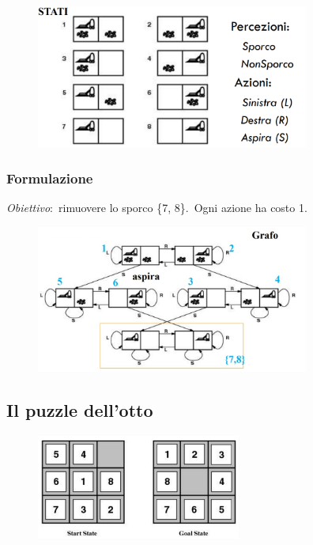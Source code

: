 \begin{figure}[H]
	\centering
	\includegraphics[width=0.8\textwidth]{immagini/Aspirapolvere.png}
\end{figure}
\subsubsection{Formulazione}
\textit{Obiettivo}:\ rimuovere lo sporco \{7, 8\}.\
Ogni azione ha costo 1.
\begin{figure}[H]
	\centering
	\includegraphics[width=0.8\textwidth]{immagini/Aspirapolvere_formulazione.jpg}
\end{figure}

\subsection{Il puzzle dell'otto}

\begin{figure}[H]
	\centering
	\includegraphics[width=0.6\textwidth]{immagini/Puzzle_otto.png}
\end{figure}

